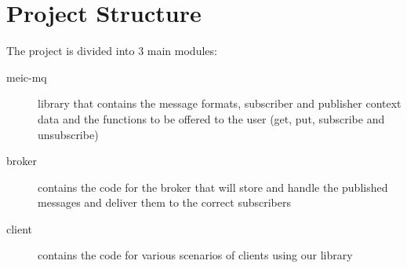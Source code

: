 \section{Project Structure}
\label{sec:Project-Structure}

The project is divided into 3 main modules:

\begin{description}
    \item[meic-mq] library that contains the message formats, subscriber and publisher context data and the functions to be offered to the user (get, put, subscribe and unsubscribe)
    \item[broker] contains the code for the broker that will store and handle the published messages and deliver them to the correct subscribers
    \item[client] contains the code for various scenarios of clients using our library 
\end{description}

